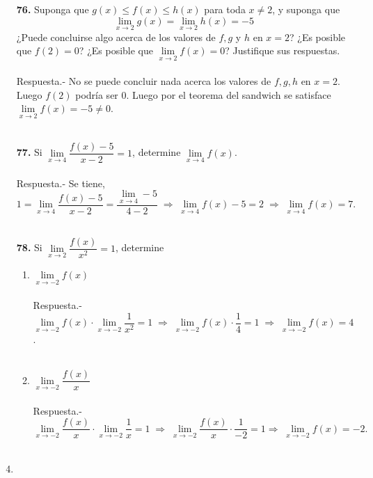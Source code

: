 \begin{enumerate}
\item [\Large\bfseries 76.]Suponga que $g(x) \leq f(x) \leq h(x)$ para toda $x \neq 2$, y suponga que
    $$\lim_{x\to 2} g(x) = \lim_{x\to 2}h(x)=-5$$
¿Puede concluirse algo acerca de los valores de $f, g$ y $h$ en $x = 2$? ¿Es posible que $f(2) = 0$? ¿Es posible que $\lim\limits_{x\to 2} f(x) = 0$? Justifique sus respuestas.\\\\
    Respuesta.-\; No se puede concluir nada acerca los valores de $f,g,h$ en $x=2$. Luego $f(2)$ podría ser $0$. Luego por el teorema del sandwich se satisface $\lim\limits_{x\to 2}f(x)=-5 \neq 0$.\\\\

\item [\Large\bfseries 77.] Si $\lim\limits_{x\to 4} \dfrac{f(x)-5}{x-2}=1$, determine $\lim\limits_{x\to 4}f(x)$.\\\\
    Respuesta.-\; Se tiene, $$1=\lim\limits_{x\to 4}\dfrac{f(x)-5}{x-2}=\dfrac{\lim\limits_{x\to 4}-5}{4-2} \; \Longrightarrow \; \lim\limits_{x\to 4} f(x)-5=2 \; \Longrightarrow \; \lim\limits_{x\to 4}f(x)=7.$$\\

\item [\Large\bfseries 78.] Si $\lim\limits_{x\to 2}\dfrac{f(x)}{x^2}=1$, determine

    \begin{enumerate}[\bfseries a)]

	\item $\lim\limits_{x\to -2} f(x)$\\\\
	    Respuesta.-\; $\lim\limits_{x\to -2} f(x) \cdot \lim\limits_{x\to -2} \dfrac{1}{x^2} = 1 \; \Longrightarrow \; \lim\limits_{x\to -2} f(x) \cdot \dfrac{1}{4} = 1 \; \Longrightarrow \; \lim\limits_{x\to -2} f(x) = 4$.\\\\

	\item $\lim\limits_{x\to -2} \dfrac{f(x)}{x}$ \\\\
	    Respuesta.-\; $\lim\limits_{x\to -2} \dfrac{f(x)}{x} \cdot \lim\limits_{x\to -2} \dfrac{1}{x} = 1 \; \Longrightarrow \; \lim\limits_{x\to -2} \dfrac{f(x)}{x} \cdot \dfrac{1}{-2} = 1 \Longrightarrow\; \lim\limits_{x\to -2}f(x)=-2.$\\\\

    \end{enumerate}

\item 

\end{enumerate}
